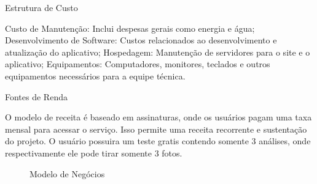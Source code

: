    Estrutura de Custo

    Custo de Manutenção: Inclui despesas gerais como energia e água; Desenvolvimento de Software: Custos relacionados ao desenvolvimento e atualização do aplicativo; Hospedagem: Manutenção de servidores para o site e o aplicativo; Equipamentos: Computadores, monitores, teclados e outros equipamentos necessários para a equipe técnica.

    Fontes de Renda

    O modelo de receita é baseado em assinaturas, onde os usuários pagam uma taxa mensal para acessar o serviço. Isso permite uma receita recorrente e sustentação do projeto. O usuário possuira um teste gratis contendo somente 3 análises, onde respectivamente ele pode tirar somente 3 fotos.

    \begin{figure}[b]
        \centering
        \caption{Modelo de Negócios}%
        \label{phot:pg-11}
    \end{figure}
    
